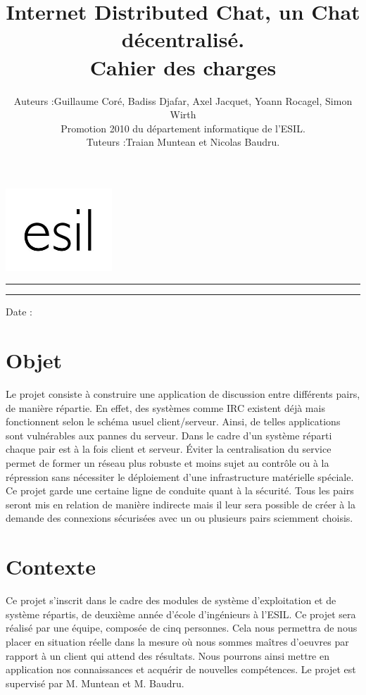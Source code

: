 \documentclass[french,11pt,a4]{article}
\title{Internet Distributed Chat, un Chat décentralisé.\\
	\Large Cahier des charges
}
\author{
\begin{tabular}{|ll|}
\hline
Auteurs :
	& \normalsize{Guillaume Coré, Badiss Djafar, Axel Jacquet, Yoann Rocagel, Simon Wirth}\\
	& \small{Promotion 2010 du département informatique de l'ESIL.}\\
\hline
Tuteurs :
	& \normalsize{Traian Muntean et Nicolas Baudru.}\\
\hline
\end{tabular}
}
\makeatletter
\def\maketitle{%
  \thispagestyle{empty}

  \vfill
  \begin{flushright}
  \includegraphics[width=4cm]{esil.jpg}
  \end{flushright}
  \par
  \normalfont
  \hrule height 2pt
  \par
  \begin{center}
    \huge \strut \@title \par
  \end{center}
  \hrule height 2pt
  \par
  \vskip 1cm
  	\vfill
         {\Large \@author\par}%
         \vskip 3.5cm
		\begin{center}
                {\Large Date : \@date\par}%
                \end{center}
                \null
                \cleardoublepage
}
\makeatother
\begin{document}
\maketitle

\tableofcontents



\newpage 






\section{Objet}

Le projet consiste à construire une application de discussion entre
différents pairs, de manière répartie. En effet, des systèmes comme IRC
existent déjà mais fonctionnent selon le schéma usuel
client/serveur. Ainsi, de telles applications sont vulnérables aux pannes
du serveur. Dans le cadre d'un système réparti chaque pair est à la
fois client et serveur. Éviter la centralisation du service permet de former un réseau plus robuste et moins sujet au contrôle ou à la répression sans nécessiter le déploiement d'une infrastructure matérielle spéciale.\\

Ce projet garde une certaine ligne de conduite quant à la sécurité. Tous les pairs seront mis en relation de manière indirecte mais il leur sera possible de créer à la demande des connexions sécurisées avec un ou plusieurs pairs sciemment choisis.\\

\section{Contexte}

Ce projet s’inscrit dans le cadre des modules de système d'exploitation et de système répartis, de
deuxième année d’école d’ingénieurs à l’ESIL. Ce projet sera réalisé par une équipe, composée de cinq personnes.
Cela nous permettra de nous placer en situation réelle dans la mesure où nous sommes maîtres d’oeuvres
par rapport à un client qui attend des résultats. Nous pourrons ainsi mettre en application nos connaissances
et acquérir de nouvelles compétences.
Le projet est supervisé par M. Muntean et M. Baudru.
\end{document}
